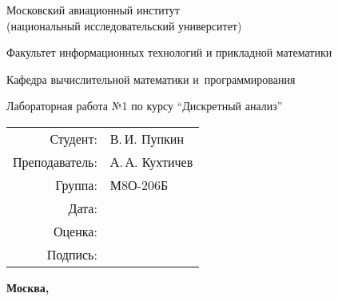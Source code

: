 \begin{titlepage}
\begin{center}
\bfseries

{\Large Московский авиационный институт\\ (национальный исследовательский университет)

}

\vspace{48pt}

{\large Факультет информационных технологий и прикладной математики
}

\vspace{36pt}


{\large Кафедра вычислительной математики и~программирования

}


\vspace{48pt}

Лабораторная работа №1 по курсу \enquote{Дискретный анализ}

\end{center}

\vspace{72pt}

\begin{flushright}
\begin{tabular}{rl}
Студент: & В.\,И. Пупкин \\
Преподаватель: & А.\,А. Кухтичев \\
Группа: & М8О-206Б \\
Дата: & \\
Оценка: & \\
Подпись: & \\
\end{tabular}
\end{flushright}

\vfill

\begin{center}
\bfseries
Москва, \the\year
\end{center}
\end{titlepage}

\pagebreak